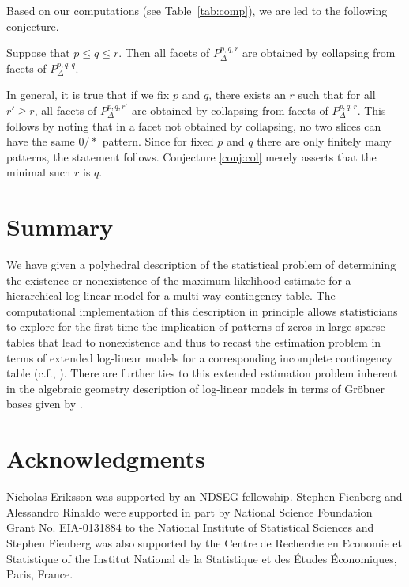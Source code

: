 \documentclass{elsart}
\begin{document}
Based on our computations  (see Table~\ref{tab:comp}), we are led to
the following conjecture.
\begin{conj}\label{conj:col}
Suppose that $p \leq q \leq r$.  Then all facets of $P_\Delta^{p,q,r}$ are
obtained by collapsing from facets of $P_\Delta^{p,q,q}$.
\end{conj}

In general, it is true that if we fix $p$ and $q$, there exists an $r$
such that for all $r ' \geq r$, all facets of $P_\Delta^{p,q,r'}$ are
obtained by collapsing from facets of $P_\Delta^{p,q,r}$.  This
follows by noting that in a facet not obtained by collapsing, no two
slices can have the same $0/\ast$ pattern.  Since for fixed $p$ and
$q$ there are only finitely many patterns, the statement follows.
Conjecture \ref{conj:col} merely asserts that the minimal such $r$ is $q$.

\section{Summary}

We have given a polyhedral description of  the statistical problem of
determining the existence or nonexistence of the maximum likelihood
estimate for a hierarchical log-linear model for a multi-way
contingency table.  The computational implementation of this
description in principle allows statisticians to
explore for the first time the implication of patterns of zeros in
large sparse tables that lead to nonexistence and thus to recast the
estimation problem in terms of extended log-linear models for a
corresponding incomplete contingency table (c.f., \cite{HAB74}).  
There are further ties to this extended estimation problem  inherent
in the algebraic geometry description of log-linear models in terms of
Gr\"obner bases given by \cite{GMS02}.


\section*{Acknowledgments}

Nicholas Eriksson was supported by an NDSEG fellowship.
Stephen Fienberg and Alessandro Rinaldo were supported in part by National Science Foundation Grant No. EIA-0131884 to the National Institute of Statistical Sciences and Stephen Fienberg was also supported  by the Centre de Recherche en Economie et
Statistique of the  Institut National de la Statistique et des
\'{E}tudes \'{E}conomiques, Paris, France.
\end{document}
